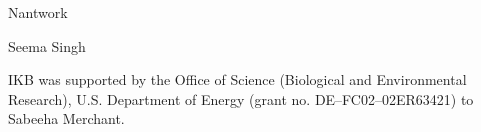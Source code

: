 \documentclass[aps,pra,reprint,superscriptaddress]{revtex4-1}
\begin{document}
%



\begin{acknowledgments}
Nantwork

Seema Singh

IKB was supported by the Office of Science (Biological and Environmental Research), U.S. Department of Energy (grant no. DE–FC02–02ER63421) to Sabeeha Merchant.
\end{acknowledgments}


\end{document}
